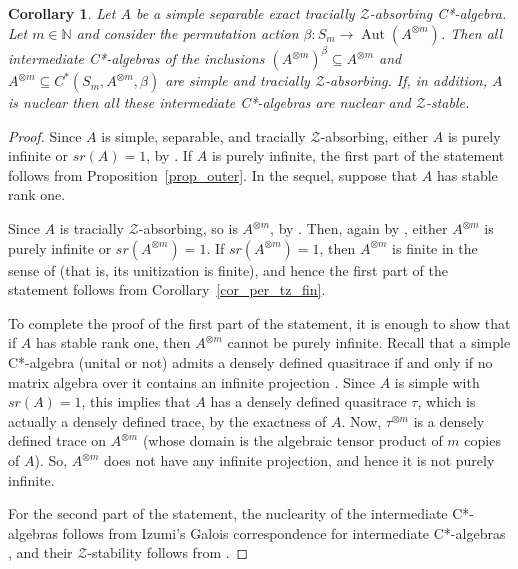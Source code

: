 \documentclass[11pt]{amsart}
\theoremstyle{plain}
\newtheorem{corollary}[theorem]{Corollary}
\theoremstyle{definition}
\theoremstyle{remark}
\numberwithin{equation}{section}
\newcommand{\bt}{\beta}
\newcommand{\Aut}{{\operatorname{Aut}}}
\begin{document}
\begin{corollary}\label{cor_per_tz}
Let $A$ be a simple separable exact tracially $\mathcal{Z}$-absorbing
C*-algebra. Let $m\in\mathbb{N}$ and consider
 the permutation action $\bt \colon S_m \to \Aut (A^{\otimes m})$.
 Then  all intermediate C*-algebras of the inclusions
$(A^{\otimes m})^\beta \subseteq A^{\otimes m}$ and 
$A^{\otimes m} \subseteq C^*(S_m, A^{\otimes m},\beta)$
are simple and tracially $\mathcal{Z}$-absorbing. 
If, in addition, $A$ is nuclear then 
all these intermediate C*-algebras 
 are   nuclear and $\mathcal{Z}$-stable.
\end{corollary}

\begin{proof}
Since $A$ is simple, separable, and  tracially $\mathcal{Z}$-absorbing,
either $A$ is purely infinite or $sr(A)=1$, by 
\cite[Theorem~4.11 and Corollary~6.5]{FLL21}.
If $A$ is purely infinite, the first part of the
 statement follows from
Proposition~\ref{prop_outer}. In the sequel, suppose that
$A$ has stable rank one.

Since $A$ is tracially $\mathcal{Z}$-absorbing,
so is $A^{\otimes m}$, by \cite[Theorem~5.1]{AGJP21}.
Then, again by \cite[Theorem~4.11 and Corollary~6.5]{FLL21},
either $A^{\otimes m}$ is purely infinite or $sr(A^{\otimes m})=1$.
If  $sr(A^{\otimes m})=1$, then $A^{\otimes m}$ is finite
in the sense of \cite[Definition~7.1]{AGJP21}
(that is, its unitization is finite), and hence
 the first part of the statement follows from 
 Corollary~\ref{cor_per_tz_fin}.
 
 To complete the proof of the first part of the statement,
it is enough to show that if  $A$ has stable rank one,
then $A^{\otimes m}$ cannot be purely infinite.
Recall that a simple C*-algebra (unital or not) admits a densely 
defined quasitrace  if and only if no matrix algebra over it 
contains an infinite projection \cite{BlkCnt1982, BlkHdm1982}.
Since $A$ is simple 
with $sr(A)=1$, this implies that $A$ has a densely defined 
quasitrace $\tau$, which is actually
a densely defined trace, by the exactness of $A$. 
Now, $\tau^{\otimes m}$ is a densely defined
 trace on $A^{\otimes m}$ (whose domain is 
 the algebraic tensor product of $m$ copies of $A$). 
 So, $A^{\otimes m}$ does not have any infinite
projection, and hence it is not purely infinite.

 For the second part of the statement,
 the nuclearity of the intermediate C*-algebras follows from 
Izumi's   Galois correspondence for
  intermediate C*-algebras 
  \cite[Corollary~6.6]{Izumi2002}, and their
   $\mathcal{Z}$-stability follows from \cite[Theorem~A]{CLS2021}.
\end{proof}
\end{document}
